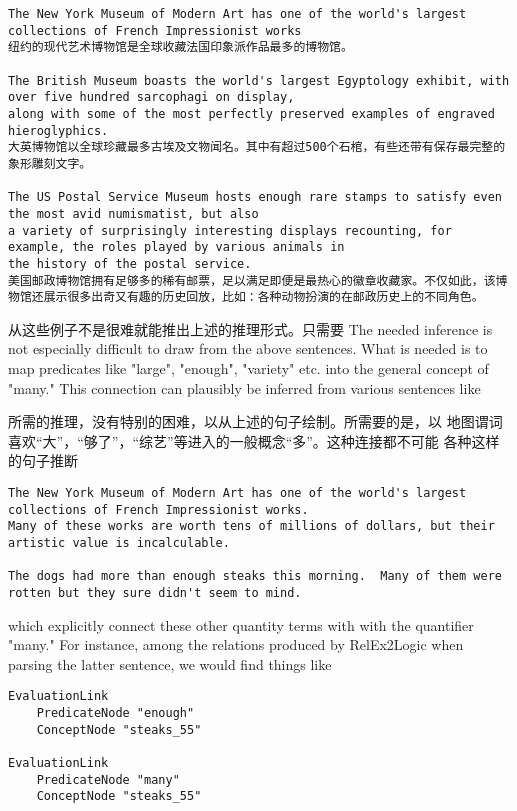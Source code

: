 \begin{verbatim}
The New York Museum of Modern Art has one of the world's largest collections of French Impressionist works
纽约的现代艺术博物馆是全球收藏法国印象派作品最多的博物馆。

The British Museum boasts the world's largest Egyptology exhibit, with over five hundred sarcophagi on display,
along with some of the most perfectly preserved examples of engraved hieroglyphics.
大英博物馆以全球珍藏最多古埃及文物闻名。其中有超过500个石棺，有些还带有保存最完整的象形雕刻文字。

The US Postal Service Museum hosts enough rare stamps to satisfy even the most avid numismatist, but also
a variety of surprisingly interesting displays recounting, for example, the roles played by various animals in
the history of the postal service.
美国邮政博物馆拥有足够多的稀有邮票，足以满足即便是最热心的徽章收藏家。不仅如此，该博物馆还展示很多出奇又有趣的历史回放，比如：各种动物扮演的在邮政历史上的不同角色。

\end{verbatim}

\noindent 从这些例子不是很难就能推出上述的推理形式。只需要
The needed inference is not especially difficult to draw from the above sentences.   What is needed is to 
map predicates like "large", "enough", "variety" etc. into the general concept of "many."   This connection can plausibly be
inferred from various sentences like


所需的推理，没有特别的困难，以从上述的句子绘制。所需要的是，以
地图谓词喜欢“大”，“够了”，“综艺”等进入的一般概念“多”。这种连接都不可能
各种这样的句子推断

\begin{verbatim}
The New York Museum of Modern Art has one of the world's largest collections of French Impressionist works.
Many of these works are worth tens of millions of dollars, but their artistic value is incalculable.

The dogs had more than enough steaks this morning.  Many of them were rotten but they sure didn't seem to mind.
\end{verbatim}

\noindent which explicitly connect these other quantity terms with with the quantifier "many."    For instance, among
the relations produced by RelEx2Logic when parsing the latter sentence, we would find things like

 {\tt\begin{small}\begin{lstlisting}
EvaluationLink
	PredicateNode "enough"
	ConceptNode "steaks_55"
	
EvaluationLink
	PredicateNode "many"
	ConceptNode "steaks_55"
\end{lstlisting}\end{small}}

